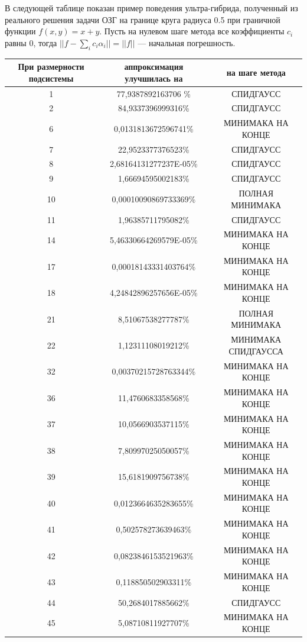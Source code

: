 \documentclass[a4paper, 12pt]{article}
\begin{document}
В следующей таблице показан пример поведения ультра-гибрида, полученный из реального решения задачи ОЗГ на границе круга радиуса 0.5 при граничной функции $f(x,y)=x+y$.
Пусть на нулевом шаге метода все коэффициенты $c_i$ равны 0, тогда $||f-\sum_i c_i \alpha_i||=||f||$ --- начальная погрешность.
\begin{center}
\begin{tabular}[t]{|c|c|c|}
  \hline
  При размерности подсистемы & аппроксимация улучшилась на & на шаге метода \\
  \hline
  1 & 77,9387892163706 \% & СПИДГАУСС \\
  2 & 84,9337396999316\% & СПИДГАУСС\\
6& 0,0131813672596741\% &МИНИМАКА НА КОНЦЕ\\
7& 22,9523377376523\% &СПИДГАУСС\\
8& 2,68164131277237E-05\% &СПИДГАУСС \\
9& 1,66694595002183\% &СПИДГАУСС \\
10& 0,00010090869733369\% & ПОЛНАЯ МИНИМАКА\\
11& 1,96385711795082\% & СПИДГАУСС\\
14&  5,46330664269579E-05\% &МИНИМАКА НА КОНЦЕ\\
17& 0,00018143331403764\% & МИНИМАКА НА КОНЦЕ\\
18& 4,24842896257656E-05\% &МИНИМАКА НА КОНЦЕ\\
21& 8,51067538277787\% & ПОЛНАЯ МИНИМАКА \\
22& 1,12311108019212\% & МИНИМАКА СПИДГАУССА\\
32&  0,00370215728763344\% & МИНИМАКА НА КОНЦЕ\\
36& 11,4760683358568\% & МИНИМАКА НА КОНЦЕ \\
37& 10,0566903537115\% & МИНИМАКА НА КОНЦЕ\\
38& 7,80997025050057\% &МИНИМАКА НА КОНЦЕ \\
39& 15,6181909756738\% &МИНИМАКА НА КОНЦЕ\\
40& 0,0123664635283655\% &МИНИМАКА НА КОНЦЕ\\
41& 0,502578273639463\% &МИНИМАКА НА КОНЦЕ\\
42& 0,0823846153521963\% &МИНИМАКА НА КОНЦЕ\\
43& 0,118850502903311\% &МИНИМАКА НА КОНЦЕ\\
44& 50,2684017885662\% &СПИДГАУСС\\
45& 5,08710811927707\% &МИНИМАКА НА КОНЦЕ \\
  \hline
  \end{tabular}
\end{center}
\end{document}
